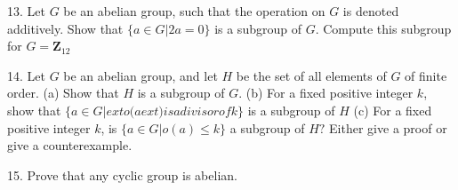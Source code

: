 \begin{mdframed}[style=darkAnswer,frametitle={Joe Starr}]

\end{mdframed}
\newpage
\begin{mdframed}[style=darkQuesion]
13. Let $G$ be an abelian group, such that the operation on $G$ is denoted additively. Show that $\{a \in G | 2 a=0\}$ is a subgroup of $G .$ Compute this subgroup for $G=\mathbf{Z}_{12}$

\end{mdframed}

\begin{mdframed}[style=darkAnswer,frametitle={Joe Starr}]

\end{mdframed}
\newpage
\begin{mdframed}[style=darkQuesion]
14. Let $G$ be an abelian group, and let $H$ be the set of all elements of $G$ of finite order.
(a) Show that $H$ is a subgroup of $G .$
(b) For a fixed positive integer $k$, show that $\{a \in G |   ext { o( } a   ext { ) is a divisor of } k\}$ is a subgroup of $H$
(c) For a fixed positive integer $k$, is $\{a \in G | o(a) \leq k\}$ a subgroup of $H ?$ Either give a proof or give a counterexample.

\end{mdframed}

\begin{mdframed}[style=darkAnswer,frametitle={Joe Starr}]

\end{mdframed}
\newpage
\begin{mdframed}[style=darkQuesion]
15. Prove that any cyclic group is abelian.
\end{mdframed}

